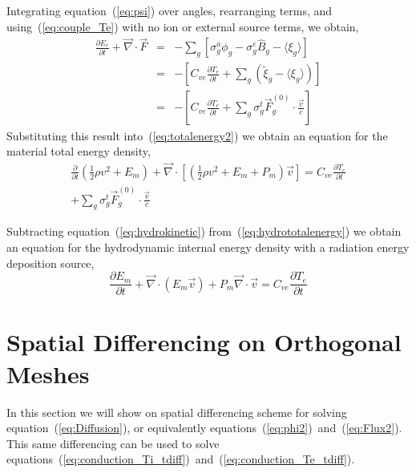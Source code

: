 \documentclass{article}
\newcommand{\partl}[2]{\ensuremath{\frac{\partial{#1}}{\partial{#2}}}}\newcommand{\del}{\ensuremath{\vec{\nabla}}}
\newcommand{\Bg}{\ensuremath{\hat{B}_{g}}}
\begin{document}
Integrating equation~(\ref{eq:psi}) over angles, rearranging terms,
and using~(\ref{eq:couple_Te}) with no ion or external source terms,
we obtain,
\begin{eqnarray}
   \partl{E_{r}}{t} + \del \cdot \vec{F}
  &=&
    - \sum_{g} \left[ \sigma^{a}_{g} \phi_{g} - \sigma^{e}_{g} \Bg
    - \langle \xi_{g} \rangle \right]
  \\
  &=& 
    - \left[ C_{ve} \partl{T_{e}}{t} + \sum_{g} \left( \tilde{\xi}_{g} 
             - \langle \xi_{g} \rangle \right) \right]
  \\
  &=& 
    - \left[ C_{ve} \partl{T_{e}}{t}
             + \sum_{g} \sigma^{t}_{g} \vec{F}^{(0)}_{g} \cdot \frac{\vec{v}}{c}
      \right]
\end{eqnarray}
Substituting this result into~(\ref{eq:totalenergy2}) we obtain an equation
for the material total energy density,
\begin{multline}
	\partl{}{t}\left( \frac{1}{2} \rho v^2
                          + E_{m}\right)
	 + \del \cdot \left[
              \left( \frac{1}{2} \rho v^2 + E_{m} + P_{m} \right) \vec{v}
                      \right]
    =
         C_{ve} \partl{T_{e}}{t}
     \\
            + \sum_{g} \sigma^{t}_{g} \vec{F}^{(0)}_{g} \cdot \frac{\vec{v}}{c}	
\label{eq:hydrototalenergy}
\end{multline}

Subtracting equation~(\ref{eq:hydrokinetic}) from~(\ref{eq:hydrototalenergy})
we obtain an equation for the hydrodynamic internal energy density with
a radiation energy deposition source,
\begin{equation}
  \boxed{
	\partl{E_{m}}{t}
	 + \del \cdot \left( E_{m} \vec{v} \right) 
         + P_{m} \del \cdot \vec{v}
    =
         C_{ve} \partl{T_{e}}{t}
  }
\label{eq:hydrointernalenergy}
\end{equation}


\section{Spatial Differencing on Orthogonal Meshes}
\label{ap:spatial}

In this section we will show on spatial differencing scheme for solving
equation~(\ref{eq:Diffusion}), or equivalently
equations~(\ref{eq:phi2})~and~(\ref{eq:Flux2}).
This same differencing can be used to solve
equations~(\ref{eq:conduction_Ti_tdiff})~and~(\ref{eq:conduction_Te_tdiff}).
\end{document}

